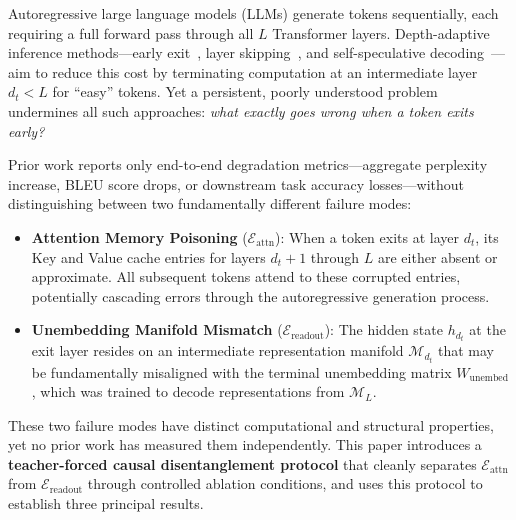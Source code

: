 \documentclass{article}
\newcommand{\Eattn}{\mathcal{E}_{\text{attn}}}
\newcommand{\Ereadout}{\mathcal{E}_{\text{readout}}}
\newcommand{\dt}{d_t}
\begin{document}
Autoregressive large language models (LLMs) generate tokens sequentially, each requiring a full forward pass through all $L$ Transformer layers. Depth-adaptive inference methods---early exit~\cite{schwartz2020right,xin2020deebert,elbayad2020depth}, layer skipping~\cite{del2023skipdecode,raposo2024mixture}, and self-speculative decoding~\cite{elhoushi2024layerskip,zhang2024draft}---aim to reduce this cost by terminating computation at an intermediate layer $\dt < L$ for ``easy'' tokens. Yet a persistent, poorly understood problem undermines all such approaches: \emph{what exactly goes wrong when a token exits early?}

Prior work reports only end-to-end degradation metrics---aggregate perplexity increase, BLEU score drops, or downstream task accuracy losses---without distinguishing between two fundamentally different failure modes:

\begin{itemize}[nosep,leftmargin=*]
    \item \textbf{Attention Memory Poisoning} ($\Eattn$): When a token exits at layer $\dt$, its Key and Value cache entries for layers $\dt{+}1$ through $L$ are either absent or approximate. All subsequent tokens attend to these corrupted entries, potentially cascading errors through the autoregressive generation process.
    \item \textbf{Unembedding Manifold Mismatch} ($\Ereadout$): The hidden state $h_{\dt}$ at the exit layer resides on an intermediate representation manifold $\mathcal{M}_{\dt}$ that may be fundamentally misaligned with the terminal unembedding matrix $W_{\text{unembed}}$, which was trained to decode representations from $\mathcal{M}_L$.
\end{itemize}

These two failure modes have distinct computational and structural properties, yet no prior work has measured them independently. This paper introduces a \textbf{teacher-forced causal disentanglement protocol} that cleanly separates $\Eattn$ from $\Ereadout$ through controlled ablation conditions, and uses this protocol to establish three principal results.
\end{document}
